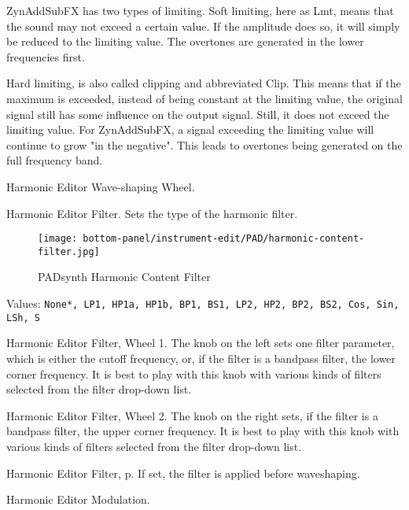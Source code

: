    ZynAddSubFX has two types of limiting. Soft limiting, here as Lmt, means
   that the sound may not exceed a certain value. If the amplitude does so,
   it will simply be reduced to the limiting value. The overtones are
   generated in the lower frequencies first.

   Hard limiting, is also called clipping and abbreviated Clip. This means
   that if the maximum is exceeded, instead of being constant at the limiting
   value, the original signal still has some influence on the output signal.
   Still, it does not exceed the limiting value. For ZynAddSubFX, a signal
   exceeding the limiting value will continue to grow "in the negative". This
   leads to overtones being generated on the full frequency band.

   Harmonic Editor Wave-shaping Wheel.

   Harmonic Editor Filter.
   Sets the type of the harmonic filter.

\begin{figure}[H]
   \centering
   \texttt{[image: bottom-panel/instrument-edit/PAD/harmonic-content-filter.jpg]}
   \caption{PADsynth Harmonic Content Filter}
   \label{fig:}
\end{figure}

   Values: \texttt{None*, LP1, HP1a, HP1b, BP1, BS1, LP2, HP2, BP2,
              BS2, Cos, Sin, LSh, S}

   Harmonic Editor Filter, Wheel 1.
   The knob on the left sets one filter parameter, which is either the cutoff
   frequency, or, if the filter is a bandpass filter, the lower corner
   frequency.
   It is best to play with this knob with various kinds of filters selected
   from the filter drop-down list.

   Harmonic Editor Filter, Wheel 2.
   The knob on the right sets, if the filter is a bandpass filter, the upper
   corner frequency.
   It is best to play with this knob with various kinds of filters selected
   from the filter drop-down list.

   Harmonic Editor Filter, p.
   If set, the filter is applied before waveshaping.

   Harmonic Editor Modulation.

